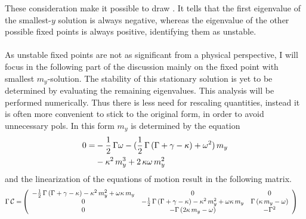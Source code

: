 These consideration make it possible to draw . It tells that the first eigenvalue of the smallest-$y$ solution is always negative, whereas the eigenvalue of the other possible fixed points is always positive, identifying them as unstable. \\\\As unstable fixed points are not as significant from a physical perspective, I will focus in the following part of the discussion mainly on the fixed point with smallest $m_y$-solution. The stability of this stationary solution is yet to be determined by evaluating the remaining eigenvalues.
This analysis will be performed numerically. Thus there is less need for rescaling quantities, instead it is often more convenient to stick to the original form, in order to avoid unnecessary pols. In this form $m_y$ is determined by the equation
\begin{align*}
    0=&-\frac{1}{2}\,\Gamma\omega-(\frac{1}{2}\,\Gamma\,(\Gamma+\gamma-\kappa)+\omega^2)\,m_y\\&-\kappa^2\,m_y^3+2\,\kappa\omega\,m_y^2
\end{align*}
and the linearization of the equations of motion result in the following matrix.
\begin{align*}
    \Gamma\,\mathcal{C}=&\left( \begin{array}{c c c}
        -\frac{1}{2}\,\Gamma\,(\Gamma+\gamma-\kappa)-\kappa^2\,m_y^2
        +\omega\kappa\,m_y&0&0\\
        0&-\frac{1}{2}\,\Gamma\,(\Gamma+\gamma-\kappa)-\kappa^2\,m_y^2
        +\omega\kappa\,m_y&\Gamma\,(\kappa\,m_y-\omega)\\
        0&-\Gamma\,(2\kappa\,m_y-\omega)&-\Gamma^2
    \end{array}  \right)
\end{align*}

